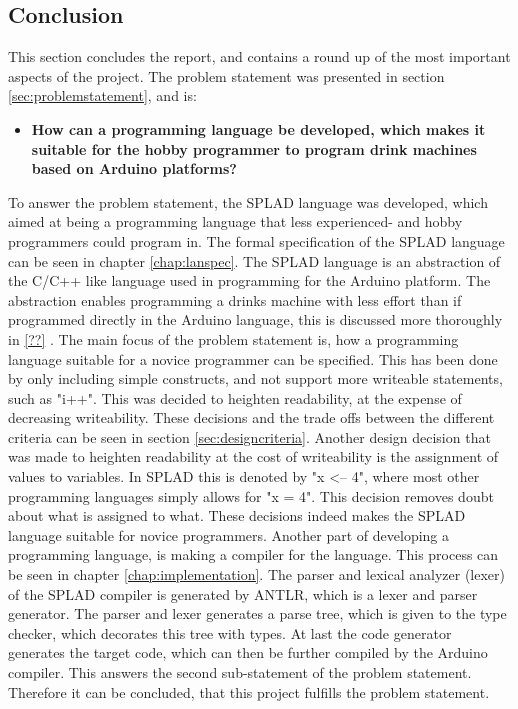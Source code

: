 \subsection{Conclusion}
This section concludes the report, and contains a round up of the most important aspects of the project.
The problem statement was presented in section \ref{sec:problemstatement}, and is: 
\begin{itemize}
	\item \textbf{How can a programming language be developed, which makes it suitable for the hobby programmer to program drink machines based on Arduino platforms?}
\end{itemize}

To answer the problem statement, the SPLAD language was developed, which aimed at being a programming language that less experienced- and hobby programmers could program in. The formal specification of the SPLAD language can be seen in chapter \ref{chap:lanspec}. The SPLAD language is an abstraction of the C/C++ like language used in programming for the Arduino platform. The abstraction enables programming a drinks machine with less effort than if programmed directly in the Arduino language, this is discussed more thoroughly in \ref{??} . The main focus of the problem statement is, how a programming language suitable for a novice programmer can be specified. This has been done by only including simple constructs, and not support more writeable statements, such as "i++". This was decided to heighten readability, at the expense of decreasing writeability. These decisions and the trade offs between the different criteria can be seen in section \ref{sec:designcriteria}. Another design decision that was made to heighten readability at the cost of writeability is the assignment of values to variables. In SPLAD this is denoted by "x <-- 4", where most other programming languages simply allows for "x = 4". This decision removes doubt about what is assigned to what. These decisions indeed makes the SPLAD language suitable for novice programmers.
Another part of developing a programming language, is making a compiler for the language. This process can be seen in chapter \ref{chap:implementation}. The parser and lexical analyzer (lexer) of the SPLAD compiler is generated by ANTLR, which is a lexer and parser generator. The parser and lexer generates a parse tree, which is given to the type checker, which decorates this tree with types. At last the code generator generates the target code, which can then be further compiled by the Arduino compiler. This answers the second sub-statement of the problem statement. Therefore it can be concluded, that this project fulfills the problem statement. 